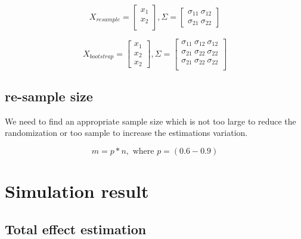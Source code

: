 \documentclass[]{article}
\begin{document}
\[
  X_{resample} = \begin{bmatrix}   
        x_1\\
        x_2\\
      \end{bmatrix},
  \Sigma = \begin{bmatrix}   
        \sigma_{11} ~ \sigma_{12}\\
        \sigma_{21} ~ \sigma_{22}
      \end{bmatrix}
\]

\[
  X_{bootstrap} = \begin{bmatrix}   
        x_1\\
        x_2\\
        x_2
      \end{bmatrix},
  \Sigma = \begin{bmatrix}   
        \sigma_{11} ~ \sigma_{12} ~ \sigma_{12}\\
        \sigma_{21} ~ \sigma_{22} ~ \sigma_{22}\\
        \sigma_{21} ~ \sigma_{22} ~ \sigma_{22}\\
      \end{bmatrix}
\]

\subsection{re-sample size}\label{re-sample-size}

We need to find an appropriate sample size which is not too large to
reduce the randomization or too sample to increase the estimations
variation.

\[
  m = p * n, \text{ where $p = (0.6 - 0.9)$}
\]

\section{Simulation result}\label{simulation-result}

\subsection{Total effect estimation}\label{total-effect-estimation}
\end{document}

